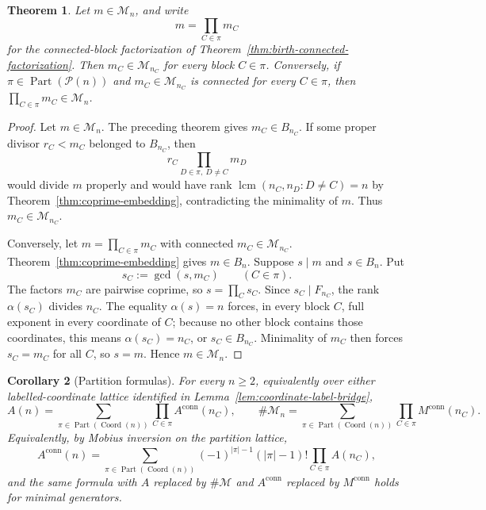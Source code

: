 \documentclass[11pt,letterpaper]{article}
\numberwithin{equation}{section}
\theoremstyle{plain}
\newtheorem{theorem}{Theorem}[section]
\newtheorem{corollary}[theorem]{Corollary}
\theoremstyle{definition}
\theoremstyle{remark}
\DeclareMathOperator{\lcmop}{lcm}
\DeclareMathOperator{\Part}{Part}
\DeclareMathOperator{\Coord}{Coord}
\begin{document}
\begin{theorem}\label{thm:mingenerator-connected-factorization}
Let \(m\in\mathcal M_n\), and write
\[
m=\prod_{C\in\pi}m_C
\]
for the connected-block factorization of
Theorem~\ref{thm:birth-connected-factorization}. Then
\(m_C\in\mathcal M_{n_C}\) for every block \(C\in\pi\). Conversely, if
\(\pi\in\Part(\mathcal P(n))\) and \(m_C\in\mathcal M_{n_C}\) is connected
for every \(C\in\pi\), then \(\prod_{C\in\pi}m_C\in\mathcal M_n\).
\end{theorem}

\begin{proof}
Let \(m\in\mathcal M_n\). The preceding theorem gives \(m_C\in B_{n_C}\).
If some proper divisor \(r_C<m_C\) belonged to \(B_{n_C}\), then
\[
r_C\prod_{D\in\pi,\ D\ne C}m_D
\]
would divide \(m\) properly and would have rank
\(\lcmop(n_C,n_D:D\ne C)=n\) by Theorem~\ref{thm:coprime-embedding},
contradicting the minimality of \(m\). Thus \(m_C\in\mathcal M_{n_C}\).

Conversely, let \(m=\prod_{C\in\pi}m_C\) with connected
\(m_C\in\mathcal M_{n_C}\). Theorem~\ref{thm:coprime-embedding} gives
\(m\in B_n\). Suppose \(s\mid m\) and \(s\in B_n\). Put
\[
s_C:=\gcd(s,m_C)\qquad(C\in\pi).
\]
The factors \(m_C\) are pairwise coprime, so \(s=\prod_C s_C\). Since
\(s_C\mid F_{n_C}\), the rank \(\alpha(s_C)\) divides \(n_C\). The equality
\(\alpha(s)=n\) forces, in every block \(C\), full exponent in every
coordinate of \(C\); because no other block contains those coordinates, this
means \(\alpha(s_C)=n_C\), or \(s_C\in B_{n_C}\). Minimality of \(m_C\) then
forces \(s_C=m_C\) for all \(C\), so \(s=m\). Hence \(m\in\mathcal M_n\).
\end{proof}

\begin{corollary}[Partition formulas]\label{cor:partition-formulas}
For every \(n\ge2\), equivalently over either labelled-coordinate lattice
identified in Lemma~\ref{lem:coordinate-label-bridge},
\begin{equation}\label{eq:partition-formula}
A(n)=\sum_{\pi\in\Part(\Coord(n))}
\prod_{C\in\pi}A^{\mathrm{conn}}(n_C),
\qquad
\#\mathcal M_n=\sum_{\pi\in\Part(\Coord(n))}
\prod_{C\in\pi}M^{\mathrm{conn}}(n_C).
\end{equation}
Equivalently, by Mobius inversion on the partition lattice,
\begin{equation}\label{eq:connected-inversion}
A^{\mathrm{conn}}(n)=
\sum_{\pi\in\Part(\Coord(n))}
(-1)^{|\pi|-1}(|\pi|-1)!\prod_{C\in\pi}A(n_C),
\end{equation}
and the same formula with \(A\) replaced by \(\#\mathcal M\) and
\(A^{\mathrm{conn}}\) replaced by \(M^{\mathrm{conn}}\) holds for minimal
generators.
\end{corollary}
\end{document}
